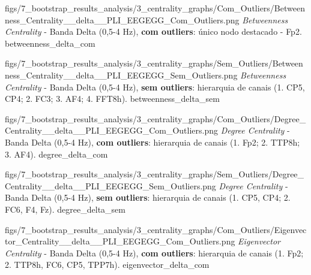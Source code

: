 
\ultrawidefigure
{figs/7_bootstrap_results_analysis/3_centrality_graphs/Com_Outliers/Betweenness_Centrality__delta__PLI_EEGEGG_Com_Outliers.png}
{\textit{Betweenness Centrality} - Banda Delta (0{,}5-4 Hz), \textbf{com outliers}: único nodo destacado - Fp2.}
{betweenness_delta_com}

\ultrawidefigure
{figs/7_bootstrap_results_analysis/3_centrality_graphs/Sem_Outliers/Betweenness_Centrality__delta__PLI_EEGEGG_Sem_Outliers.png}
{\textit{Betweenness Centrality} - Banda Delta (0{,}5-4 Hz), \textbf{sem outliers}: hierarquia de canais (1. CP5, CP4; 2. FC3; 3. AF4; 4. FFT8h).}
{betweenness_delta_sem}


\ultrawidefigure
{figs/7_bootstrap_results_analysis/3_centrality_graphs/Com_Outliers/Degree_Centrality__delta__PLI_EEGEGG_Com_Outliers.png}
{\textit{Degree Centrality} - Banda Delta (0{,}5-4 Hz), \textbf{com outliers}: hierarquia de canais (1. Fp2; 2. TTP8h; 3. AF4).}
{degree_delta_com}

\ultrawidefigure
{figs/7_bootstrap_results_analysis/3_centrality_graphs/Sem_Outliers/Degree_Centrality__delta__PLI_EEGEGG_Sem_Outliers.png}
{\textit{Degree Centrality} - Banda Delta (0{,}5-4 Hz), \textbf{sem outliers}: hierarquia de canais (1. CP5, CP4; 2. FC6, F4, Fz).}
{degree_delta_sem}


\ultrawidefigure
{figs/7_bootstrap_results_analysis/3_centrality_graphs/Com_Outliers/Eigenvector_Centrality__delta__PLI_EEGEGG_Com_Outliers.png}
{\textit{Eigenvector Centrality} - Banda Delta (0{,}5-4 Hz), \textbf{com outliers}: hierarquia de canais (1. Fp2; 2. TTP8h, FC6, CP5, TPP7h).}
{eigenvector_delta_com}

